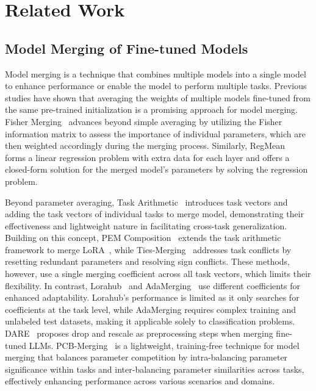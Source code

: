 \section{Related Work}
\subsection{Model Merging of Fine-tuned Models}
Model merging is a technique that combines multiple models into a single model to enhance performance or enable the model to perform multiple tasks. 
Previous studies have shown that averaging the weights of multiple models fine-tuned from the same pre-trained initialization is a promising approach for model merging. 
Fisher Merging~\citep{matena2022merging} advances beyond simple averaging by utilizing the Fisher information matrix to assess the importance of individual parameters, which are then weighted accordingly during the merging process. Similarly, RegMean~\citep{jin2022dataless} forms a linear regression problem with extra data for each layer and offers a closed-form solution for the merged model's parameters by solving the regression problem.


Beyond parameter averaging, Task Arithmetic~\citep{ilharco2022editing} introduces task vectors and adding the task vectors of individual tasks to merge model, demonstrating their effectiveness and lightweight nature in facilitating cross-task generalization. Building on this concept, PEM Composition~\citep{zhang2023composing} extends the task arithmetic framework to merge LoRA~\citep{hu2021lora}, while Ties-Merging~\citep{yadav2024ties} addresses task conflicts by resetting redundant parameters and resolving sign conflicts. These methods, however, use a single merging coefficient across all task vectors, which limits their flexibility. In contrast, Lorahub~\citep{huang2023lorahub} and AdaMerging~\citep{yang2023adamerging} use different coefficients for enhanced adaptability. Lorahub's performance is limited as it only searches for coefficients at the task level, while AdaMerging requires complex training and unlabeled test datasets, making it applicable solely to classification problems. DARE~\citep{yu2024language} proposes drop and rescale as preprocessing steps when merging fine-tuned LLMs. PCB-Merging~\citep{du2024parameter} is a lightweight, training-free technique for model merging that balances parameter competition by intra-balancing parameter significance within tasks and inter-balancing parameter similarities across tasks, effectively enhancing performance across various scenarios and domains.


